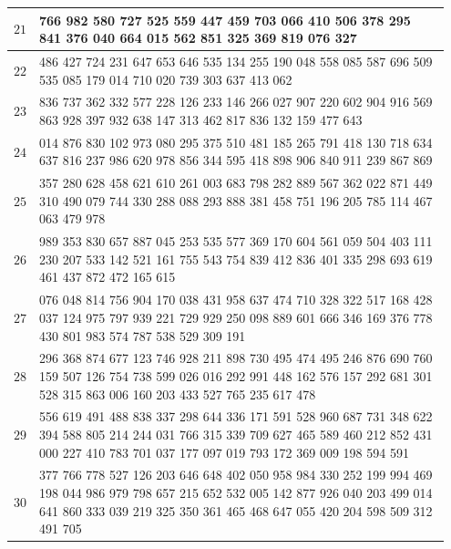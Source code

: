 \documentclass[onefignum, onetabnum]{siamart190516}
\newcommand{\<}{\langle}
\renewcommand{\>}{\rangle}
\begin{document}
\begin{table}[h]
\begin{center}
{\begin{tabular}{|c| >{\centering\arraybackslash} p{0.95\linewidth}|}
 \hline $ 21$ &  19 766 982 580 727 525 559 447 459 703 066 410 506 378 295 841 376 040 664 015 562 851 325 369 819 076 327 \\
 \hline $ 22$ &  920 486 427 724 231 647 653 646 535 134 255 190 048 558 085 587 696 509 535 085 179 014 710 020 739 303 637 413 062 \\
 \hline $ 23$ & 96 836 737 362 332 577 228 126 233 146 266 027 907 220 602 904 916 569 863 928 397 932 638 147 313 462 817 836 132 159 477 643 \\
 \hline $ 24$ & 23 014 876 830 102 973 080 295 375 510 481 185 265 791 418 130 718 634 637 816 237 986 620 978 856 344 595 418 898 906 840 911 239 867 869 \\
 \hline $ 25$ & 12 357 280 628 458 621 610 261 003 683 798 282 889 567 362 022 871 449 310 490 079 744 330 288 088 293 888 381 458 751 196 205 785 114 467 063 479 978 \\
 \hline $ 26$ & 14 989 353 830 657 887 045 253 535 577 369 170 604 561 059 504 403 111 230 207 533 142 521 161 755 543 754 839 412 836 401 335 298 693 619 461 437 872 472 165 615 \\
 \hline $ 27$ &  41 076 048 814 756 904 170 038 431 958 637 474 710 328 322 517 168 428 037 124 975 797 939 221 729 929 250 098 889 601 666 346 169 376 778 430 801 983 574 787 538 529 309 191 \\
 \hline $ 28$ &  254 296 368 874 677 123 746 928 211 898 730 495 474 495 246 876 690 760 159 507 126 754 738 599 026 016 292 991 448 162 576 157 292 681 301 528 315 863 006 160 203 433 527 765 235 617 478 \\
 \hline $ 29$ & 3 556 619 491 488 838 337 298 644 336 171 591 528 960 687 731 348 622 394 588 805 214 244 031 766 315 339 709 627 465 589 460 212 852 431 000 227 410 783 701 037 177 097 019 793 172 369 009 198 594 591 \\
 \hline $ 30$ &  112 377 766 778 527 126 203 646 648 402 050 958 984 330 252 199 994 469 198 044 986 979 798 657 215 652 532 005 142 877 926 040 203 499 014 641 860 333 039 219 325 350 361 465 468 647 055 420 204 598 509 312 491 705 \\
  \hline
\end{tabular}
}
\end{center}
\label{tbl:squaregrid}
\end{table}
\end{document}
